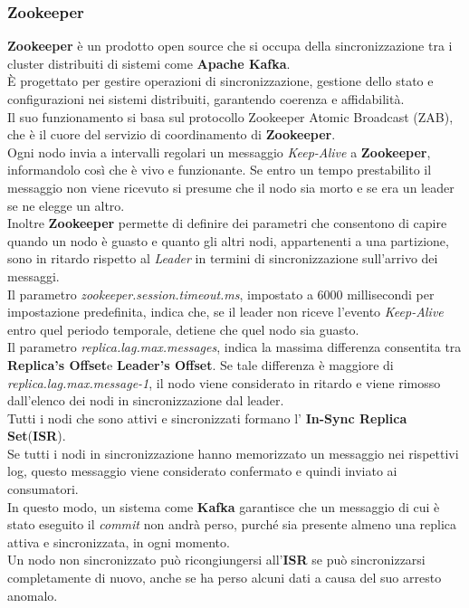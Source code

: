 \subsubsection{Zookeeper}
\textbf{Zookeeper} è un prodotto \gls{open source}{} che si occupa della sincronizzazione tra i cluster distribuiti di sistemi come \textbf{Apache Kafka}. \\
È progettato per gestire operazioni di sincronizzazione, gestione dello stato e configurazioni nei sistemi distribuiti, garantendo coerenza e affidabilità.\\
Il suo funzionamento si basa sul protocollo Zookeeper Atomic Broadcast (ZAB), che è il cuore del servizio di coordinamento di \textbf{Zookeeper}.\\
Ogni nodo invia a intervalli regolari un messaggio \textit{Keep-Alive} a \textbf{Zookeeper}, informandolo così che è vivo e funzionante. Se entro un tempo prestabilito il messaggio non viene ricevuto si presume che il nodo sia
morto e se era un leader se ne elegge un altro.\\
Inoltre \textbf{Zookeeper} permette di definire dei parametri che consentono di capire quando un nodo è guasto e quanto gli altri nodi, appartenenti a una partizione,  sono in ritardo rispetto al \textit{Leader} in termini di sincronizzazione sull'arrivo dei messaggi.\\
Il parametro \textit{zookeeper.session.timeout.ms}, impostato a 6000 millisecondi per impostazione predefinita, indica che, se il leader non riceve l'evento \textit{Keep-Alive} entro quel periodo temporale, detiene che quel nodo sia guasto.\\
Il parametro \textit{replica.lag.max.messages}, indica la massima differenza consentita tra \textbf{Replica's Offset}e \textbf{Leader's Offset}. Se tale differenza è maggiore di \textit{replica.lag.max.message-1}, il nodo viene considerato in ritardo e viene rimosso dall'elenco dei nodi in sincronizzazione dal leader. \\
Tutti i nodi che sono attivi e sincronizzati formano l' \textbf{In-Sync Replica Set}(\textbf{ISR}).\\
Se tutti i nodi in sincronizzazione hanno memorizzato un messaggio nei rispettivi \gls{log}{}, questo messaggio viene considerato confermato e quindi inviato ai consumatori. \\
In questo modo, un sistema come \textbf{Kafka} garantisce che un messaggio di cui è stato eseguito il \textit{commit} non andrà perso, purché sia presente almeno una replica attiva e sincronizzata, in ogni momento.\\
Un nodo non sincronizzato può ricongiungersi all'\textbf{ISR} se può sincronizzarsi completamente di nuovo, anche se ha perso alcuni dati a causa del suo arresto anomalo.
